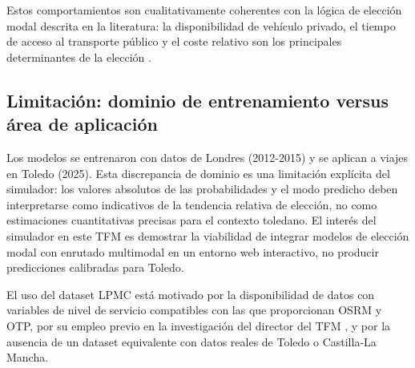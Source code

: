 Estos comportamientos son cualitativamente coherentes con la lógica de elección modal descrita en la literatura: la disponibilidad de vehículo privado, el tiempo de acceso al transporte público y el coste relativo son los principales determinantes de la elección \cite{Train2009,MartinBaos2023Thesis}.

\subsection{Limitación: dominio de entrenamiento versus área de aplicación}

Los modelos se entrenaron con datos de Londres (2012-2015) y se aplican a viajes en Toledo (2025). Esta discrepancia de dominio es una limitación explícita del simulador: los valores absolutos de las probabilidades y el modo predicho deben interpretarse como indicativos de la tendencia relativa de elección, no como estimaciones cuantitativas precisas para el contexto toledano. El interés del simulador en este TFM es demostrar la viabilidad de integrar modelos de elección modal con enrutado multimodal en un entorno web interactivo, no producir predicciones calibradas para Toledo.

El uso del dataset LPMC está motivado por la disponibilidad de datos con variables de nivel de servicio compatibles con las que proporcionan OSRM y OTP, por su empleo previo en la investigación del director del TFM \cite{MartinBaos2023Thesis}, y por la ausencia de un dataset equivalente con datos reales de Toledo o Castilla-La Mancha.
